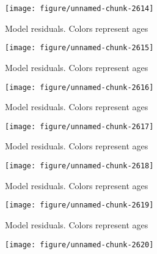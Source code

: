 \documentclass[a4paper]{article}\usepackage{graphicx, color}
\makeatletter
\def\maxwidth{ %
  \ifdim\Gin@nat@width>\linewidth
    \linewidth
  \else
    \Gin@nat@width
  \fi
}
\newenvironment{knitrout}{}{} %
\makeatother
\begin{document}
\begin{knitrout}
\begin{figure}[H]
{\centering \texttt{[image: figure/unnamed-chunk-2614]} 

}

\caption[Model residuals]{Model residuals. Colors represent ages\label{fig:unnamed-chunk-2614}}
\end{figure}
\begin{figure}[H]


{\centering \texttt{[image: figure/unnamed-chunk-2615]} 

}

\caption[Model residuals]{Model residuals. Colors represent ages\label{fig:unnamed-chunk-2615}}
\end{figure}
\begin{figure}[H]


{\centering \texttt{[image: figure/unnamed-chunk-2616]} 

}

\caption[Model residuals]{Model residuals. Colors represent ages\label{fig:unnamed-chunk-2616}}
\end{figure}
\begin{figure}[H]


{\centering \texttt{[image: figure/unnamed-chunk-2617]} 

}

\caption[Model residuals]{Model residuals. Colors represent ages\label{fig:unnamed-chunk-2617}}
\end{figure}
\begin{figure}[H]


{\centering \texttt{[image: figure/unnamed-chunk-2618]} 

}

\caption[Model residuals]{Model residuals. Colors represent ages\label{fig:unnamed-chunk-2618}}
\end{figure}
\begin{figure}[H]


{\centering \texttt{[image: figure/unnamed-chunk-2619]} 

}

\caption[Model residuals]{Model residuals. Colors represent ages\label{fig:unnamed-chunk-2619}}
\end{figure}
\begin{figure}[H]


{\centering \texttt{[image: figure/unnamed-chunk-2620]} 

}


\end{figure}
\end{knitrout}
\end{document}

